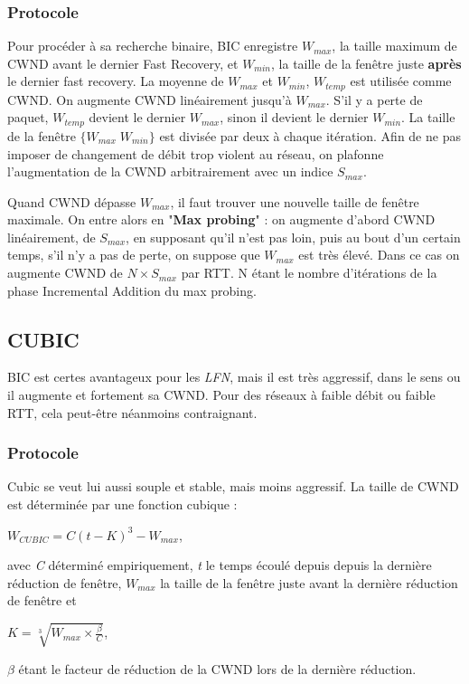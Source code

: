 \documentclass[	DIV=calc,%
							paper=a4,%
							fontsize=11pt,%
							twocolumn]{scrartcl}	 					%
\begin{document}
\subsubsection*{Protocole}
Pour procéder à sa recherche binaire, BIC enregistre $W_{max}$, la taille maximum de CWND avant le dernier Fast Recovery, et $W_{min}$, la taille de la fenêtre juste \textbf{après} le dernier fast recovery. La moyenne de $W_{max}$ et $W_{min}$, $W_{temp}$ est utilisée comme CWND. On augmente CWND linéairement jusqu'à $W_{max}$. S'il y a perte de paquet, $W_{temp}$ devient le dernier $W_{max}$, sinon il devient le dernier $W_{min}$. La taille de la fenêtre $\{W_{max}\;W_{min}\}$ est divisée par deux à chaque itération. Afin de ne pas imposer de changement de débit trop violent au réseau, on plafonne l'augmentation de la CWND arbitrairement avec un indice $S_{max}$.

Quand CWND dépasse $W_{max}$, il faut trouver une nouvelle taille de fenêtre maximale. On entre alors en "\textbf{Max probing}" : on augmente d'abord CWND linéairement, de $S_{max}$, en supposant qu'il n'est pas loin, puis au bout d'un certain temps, s'il n'y a pas de perte, on suppose que $W_{max}$ est très élevé. Dans ce cas on augmente CWND de $N \times S_{max}$ par RTT. N étant le nombre d'itérations de la phase Incremental Addition du max probing.

\subsection*{CUBIC}
BIC est certes avantageux pour les \textit{LFN}, mais il est très aggressif, dans le sens ou il augmente et  fortement sa CWND. Pour des réseaux à faible débit ou faible RTT, cela peut-être néanmoins contraignant.
\subsubsection*{Protocole}
Cubic se veut lui aussi souple et stable, mais moins aggressif. La taille de CWND est déterminée par une fonction cubique : 

\textbf{$W_{CUBIC} = C(t-K)^3 - W_{max}$},

 avec \textit{C} déterminé empiriquement, \textit{t} le temps écoulé depuis depuis la dernière réduction de fenêtre, $W_{max}$ la taille de la fenêtre juste avant la dernière réduction de fenêtre et 

$K = \sqrt[3]{W_{max}\times\frac{\beta}{C}}$, 

$\beta$ étant le facteur de réduction de la CWND lors de la dernière réduction.
\end{document}
